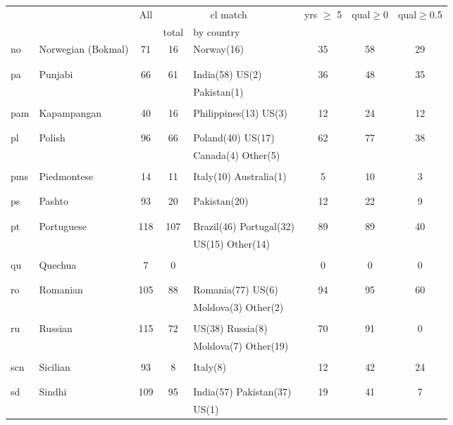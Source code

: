 \begin{figure}[h]
\centering
\begin{tabular}{llcclccc}
&&All&\multicolumn{2}{c}{cl match}&yrs $\geq$ 5&qual$\geq$0&qual$\geq$0.5\\
&&&total&by country&&\\
\hline\hline
no&Norwegian (Bokmal)&71&16&Norway(16) &35&58&29\\
&&&&&&&\\
&&&&&&&\\
pa&Punjabi&66&61&India(58) US(2) &36&48&35\\
&&&&Pakistan(1) &&&\\
&&&&&&&\\
pam&Kapampangan&40&16&Philippines(13) US(3) &12&24&12\\
&&&&&&&\\
&&&&&&&\\
pl&Polish&96&66&Poland(40) US(17) &62&77&38\\
&&&&Canada(4) Other(5) &&&\\
&&&&&&&\\
pms&Piedmontese&14&11&Italy(10) Australia(1) &5&10&3\\
&&&&&&&\\
&&&&&&&\\
ps&Pashto&93&20&Pakistan(20) &12&22&9\\
&&&&&&&\\
&&&&&&&\\
pt&Portuguese&118&107&Brazil(46) Portugal(32) &89&89&40\\
&&&&US(15) Other(14) &&&\\
&&&&&&&\\
qu&Quechua&7&0&&0&0&0\\
&&&&&&&\\
&&&&&&&\\
ro&Romanian&105&88&Romania(77) US(6) &94&95&60\\
&&&&Moldova(3) Other(2) &&&\\
&&&&&&&\\
ru&Russian&115&72&US(38) Russia(8) &70&91&0\\
&&&&Moldova(7) Other(19) &&&\\
&&&&&&&\\
scn&Sicilian&93&8&Italy(8) &12&42&24\\
&&&&&&&\\
&&&&&&&\\
sd&Sindhi&109&95&India(57) Pakistan(37) &19&41&7\\
&&&&US(1) &&&\\

\end{tabular}
\end{figure}
